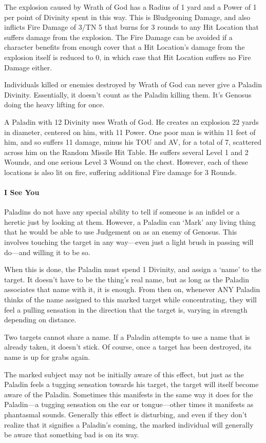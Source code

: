 \documentclass[oneside,11pt,english]{book}
\begin{document}
The explosion caused by Wrath of God has a Radius of 1 yard and a Power of 1 per point of 
Divinity spent in this way. This is Bludgeoning Damage, and also inflicts Fire Damage of 3/TN 5 
that burns for 3 rounds to any Hit Location that suffers damage from the explosion. The Fire 
Damage can be avoided if a character benefits from enough cover that a Hit Location's damage 
from the explosion itself is reduced to 0, in which case that Hit Location suffers no Fire Damage 
either. 


Individuals killed or enemies destroyed by Wrath of God can never give a Paladin Divinity. 
Essentially, it doesn't count as the Paladin killing them. It's Genosus doing the heavy lifting for 
once. 


A Paladin with 12 Divinity uses Wrath of God. He creates an explosion 22 yards in diameter, centered on him, with 11 
Power. One poor man is within 11 feet of him, and so suffers 11 damage, minus his TOU and AV, for a total of 7, 
scattered across him on the Random Missile Hit Table. He suffers several Level 1 and 2 Wounds, and one serious Level 
3 Wound on the chest. However, each of these locations is also lit on fire, suffering additional Fire damage for 3 
Rounds. 
 
\paragraph{I See You}
Paladins do not have any special ability to tell if someone is an infidel or a heretic just by looking 
at them. However, a Paladin can ‘Mark’ any living thing that he would be able to use Judgement 
on as an enemy of Genosus. This involves touching the target in any way—even just a light brush in passing will do—and willing it to be so.


When this is done, the Paladin must spend 1 Divinity, and assign a ‘name’ to the target. It doesn't have to be the thing's real name, but as long as the Paladin associates that name with it, it is enough. From then on, whenever ANY Paladin thinks of the name assigned to this marked target while concentrating, they will feel a pulling sensation in the direction that the target is, varying in strength depending on distance.


Two targets cannot share a name. If a Paladin attempts to use a name that is already taken, it doesn't stick. Of course, once a target has been destroyed, its name is up for grabs again.


The marked subject may not be initially aware of this effect, but just as the Paladin feels a tugging sensation towards his target, the target will itself become aware of the Paladin.
Sometimes this manifests in the same way it does for the Paladin—a tugging sensation on the ear or tongue—other times it manifests as phantasmal sounds.
Generally this effect is disturbing, and even if they don't realize that it signifies a Paladin's coming, the marked individual will generally be aware that something bad is on its way. 
\end{document}
